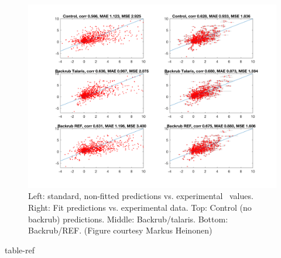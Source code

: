 \begin{figure}
  \centering
  \includegraphics[width=\textwidth,keepaspectratio]{figures/zemu-sigmoid2-corrs.png}
  \caption[Interface \ddg prediction performance with sigmoid fit score function]{
    Left: standard, non-fitted predictions vs. experimental \ddg\ values. Right: Fit predictions vs. experimental data. Top: Control (no backrub) predictions. Middle: Backrub/talaris. Bottom: Backrub/REF. (Figure courtesy Markus Heinonen)
  } \label{fig:t14-fit-scatter}
\end{figure}

{table-ref}



{}
{\csvlinetotablerow}


